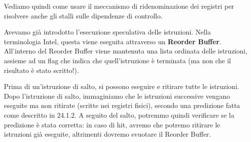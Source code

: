 \documentclass[a4paper,11pt]{article}
\begin{document}
Vediamo quindi come usare il meccanismo di ridenominazione dei registri per risolvere anche gli stalli sulle dipendenze di controllo.

Avevamo già introdotto l'esecuzione speculativa delle istruzioni.
Nella terminologia Intel, questa viene eseguita attraverso un \textbf{Reorder Buffer}.
All'interno del Reorder Buffer viene mantenuta una lista ordinata delle istruzioni, assieme ad un flag che indica che quell'istruzione è terminata (ma non che il risultato è stato scritto!).

Prima di un'istruzione di salto, si possono eseguire e ritirare tutte le istruzioni.
Dopo l'istruzione di salto, immaginiamo che le istruzioni successive vengano eseguite ma non ritirate (scritte nei registri fisici), secondo una predizione fatta come descritto in 24.1.2.
A seguito del salto, potremmo quindi verificare se la predizione è stata corretta: in caso di hit, avremo che potremo ritirare le istruzioni già eseguite, altrimenti dovremo svuotare il Reorder Buffer.
\end{document}
